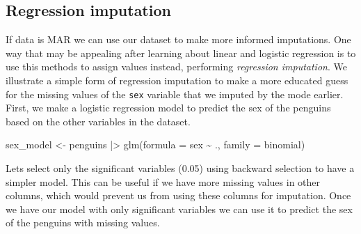 \documentclass[
  letterpaper,
  DIV=11,
  numbers=noendperiod]{scrreprt}
\newenvironment{Shaded}{\begin{snugshade}}{\end{snugshade}}
\newcommand{\AttributeTok}[1]{\textcolor[rgb]{0.40,0.45,0.13}{#1}}
\newcommand{\FunctionTok}[1]{\textcolor[rgb]{0.28,0.35,0.67}{#1}}
\newcommand{\NormalTok}[1]{\textcolor[rgb]{0.00,0.23,0.31}{#1}}
\newcommand{\OtherTok}[1]{\textcolor[rgb]{0.00,0.23,0.31}{#1}}
\newcommand{\SpecialCharTok}[1]{\textcolor[rgb]{0.37,0.37,0.37}{#1}}
\begin{document}
\subsection{Regression imputation}\label{regression-imputation}

If data is MAR we can use our dataset to make more informed imputations.
One way that may be appealing after learning about linear and logistic
regression is to use this methods to assign values instead, performing
\emph{regression imputation}. We illustrate a simple form of regression
imputation to make a more educated guess for the missing values of the
\texttt{sex} variable that we imputed by the mode earlier. First, we
make a logistic regression model to predict the sex of the penguins
based on the other variables in the dataset.

\begin{Shaded}
\begin{Highlighting}[]
\NormalTok{sex\_model }\OtherTok{\textless{}{-}}\NormalTok{ penguins }\SpecialCharTok{|\textgreater{}} \FunctionTok{glm}\NormalTok{(}\AttributeTok{formula =}\NormalTok{ sex }\SpecialCharTok{\textasciitilde{}}\NormalTok{ ., }\AttributeTok{family =}\NormalTok{ binomial)}
\end{Highlighting}
\end{Shaded}

Lets select only the significant variables (0.05) using backward
selection to have a simpler model. This can be useful if we have more
missing values in other columns, which would prevent us from using these
columns for imputation. Once we have our model with only significant
variables we can use it to predict the sex of the penguins with missing
values.
\end{document}

